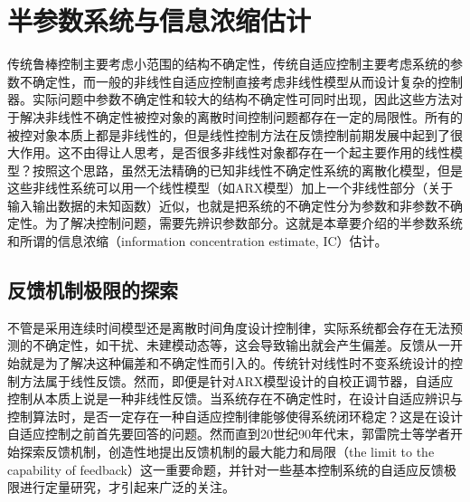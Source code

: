\chapter{半参数系统与信息浓缩估计}
\label{chap:2}
传统鲁棒控制主要考虑小范围的结构不确定性，传统自适应控制主要考虑系统的参数不确定性，而一般的非线性自适应控制直接考虑非线性模型从而设计复杂的控制器。实际问题中参数不确定性和较大的结构不确定性可同时出现，因此这些方法对于解决非线性不确定性被控对象的离散时间控制问题都存在一定的局限性。所有的被控对象本质上都是非线性的，但是线性控制方法在反馈控制前期发展中起到了很大作用。这不由得让人思考，是否很多非线性对象都存在一个起主要作用的线性模型？按照这个思路，虽然无法精确的已知非线性不确定性系统的离散化模型，但是这些非线性系统可以用一个线性模型（如ARX模型）加上一个非线性部分（关于输入输出数据的未知函数）近似，也就是把系统的不确定性分为参数和非参数不确定性。为了解决控制问题，需要先辨识参数部分。这就是本章要介绍的半参数系统和所谓的信息浓缩（information concentration estimate, IC）估计。

\section{反馈机制极限的探索}
\label{sect:2.1}
不管是采用连续时间模型还是离散时间角度设计控制律，实际系统都会存在无法预测的不确定性，如干扰、未建模动态等，这会导致输出就会产生偏差。反馈从一开始就是为了解决这种偏差和不确定性而引入的。传统针对线性时不变系统设计的控制方法属于线性反馈。然而，即便是针对ARX模型设计的自校正调节器，自适应控制从本质上说是一种非线性反馈。当系统存在不确定性时，在设计自适应辨识与控制算法时，是否一定存在一种自适应控制律能够使得系统闭环稳定？这是在设计自适应控制之前首先要回答的问题。然而直到20世纪90年代末，郭雷院士等学者开始探索反馈机制，创造性地提出反馈机制的最大能力和局限（the limit to the capability of feedback）这一重要命题，并针对一些基本控制系统的自适应反馈极限进行定量研究，才引起来广泛的关注。

